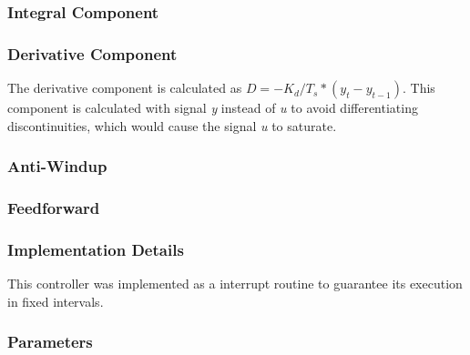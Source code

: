 \subsubsection{Integral Component}
\label{sub:IntegralComponent}

\subsubsection{Derivative Component}
\label{sub:Derivative Component}

The derivative component is calculated as $ D = - K_d/T_s * (y_{t}-y_{t-1})$. This component is calculated with signal \emph{y} instead of \emph{u} to avoid differentiating discontinuities, which would cause the signal \emph{u} to saturate.

\subsubsection{Anti-Windup}
\label{sub:AntiWindup}

\subsubsection{Feedforward}
\label{sub:Feedforward}

\subsubsection{Implementation Details}
\label{sub:Implementation Details}

This controller was implemented as a interrupt routine to guarantee its execution in fixed intervals.

\subsubsection{Parameters}
\label{sub:Parameters}
